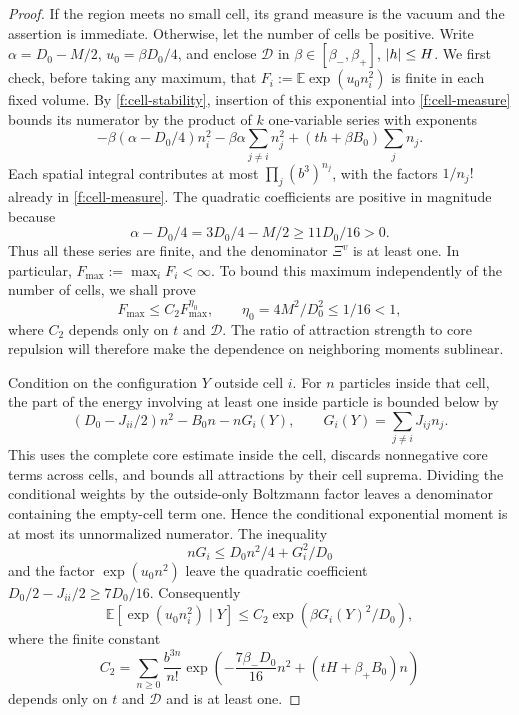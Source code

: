 \begin{proof}
If the region meets no small cell, its grand measure is the vacuum and
the assertion is immediate.  Otherwise, let the number of cells be positive.
Write $\alpha=D_0-M/2$, $u_0=\beta D_0/4$, and enclose
$\mathcal D$ in $\beta\in[\beta_-,\beta_+]$, $\left|h\right|\le H$.
We first check, before taking any maximum, that
$F_i:=\mathbb E\exp(u_0n_i^2)$ is finite in each fixed volume.
By \eqref{f:cell-stability}, insertion of this exponential into
\eqref{f:cell-measure} bounds its numerator by the product of $k$
one-variable series with exponents
\[
 -\beta(\alpha-D_0/4)n_i^2
 -\beta\alpha\sum_{j\ne i}n_j^2
 +(th+\beta B_0)\sum_j n_j.
\]
Each spatial integral contributes at most
$\prod_j(b^3)^{n_j}$, with the factors $1/n_j!$ already in
\eqref{f:cell-measure}.  The quadratic coefficients are positive in
magnitude because
\[
 \alpha-D_0/4=3D_0/4-M/2\ge11D_0/16>0.
\]
Thus all these series are finite, and the denominator $\Xi^v$ is at
least one.  In particular,
$F_{\max}:=\max_iF_i<\infty$.  To bound this maximum independently of
the number of cells, we shall prove
\[
 F_{\max}\le C_2 F_{\max}^{\eta_0},
 \qquad \eta_0=4M^2/D_0^2\le1/16<1,
\]
where $C_2$ depends only on $t$ and $\mathcal D$.
The ratio of attraction strength to core repulsion will therefore
make the dependence on neighboring moments sublinear.

Condition on the configuration $Y$ outside cell $i$.  For $n$
particles inside that cell, the part of the energy involving at least
one inside particle is bounded below by
\begin{equation}\label{f:conditional-energy}
 (D_0-J_{ii}/2)n^2-B_0n-nG_i(Y),
 \qquad G_i(Y)=\sum_{j\ne i}J_{ij}n_j.
\end{equation}
This uses the complete core estimate inside the cell, discards
nonnegative core terms across cells, and bounds all attractions by
their cell suprema.  Dividing the conditional weights by the
outside-only Boltzmann factor leaves a denominator containing the
empty-cell term one.  Hence the conditional exponential moment is
at most its unnormalized numerator.  The inequality
\[
 nG_i\le D_0n^2/4+G_i^2/D_0
\]
and the factor $\exp(u_0n^2)$ leave the quadratic coefficient
$D_0/2-J_{ii}/2\ge7D_0/16$.  Consequently
\begin{equation}\label{f:conditional-moment}
 \mathbb E[\exp(u_0n_i^2)\mid Y]
 \le C_2\exp(\beta G_i(Y)^2/D_0),
\end{equation}
where the finite constant
\[
 C_2=\sum_{n\ge0}\frac{b^{3n}}{n!}
       \exp\left(-\frac{7\beta_-D_0}{16}n^2
                    +(tH+\beta_+B_0)n\right)
\]
depends only on $t$ and $\mathcal D$ and is at least one.


\end{proof}
